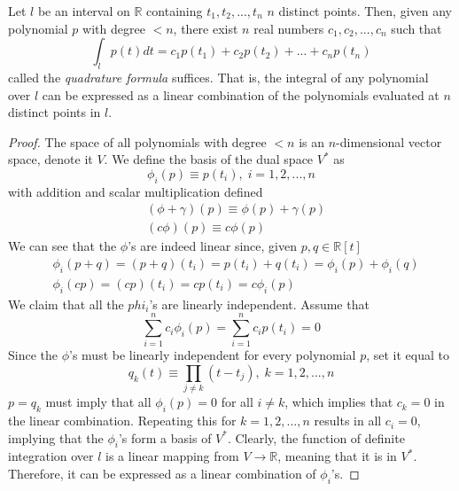   \begin{theorem}
    Let $l$ be an interval on $\mathbb{R}$ containing $t_1, t_2, ..., t_n$ $n$ distinct points. Then, given any polynomial $p$ with degree $< n$, there exist $n$ real numbers $c_1, c_2, ..., c_n$ such that
    \begin{equation}
      \int_l p(t) d t = c_1 p(t_1) + c_2 p(t_2) + ... + c_n p(t_n)
    \end{equation}
    called the \textit{quadrature formula} suffices. That is, the integral of any polynomial over $l$ can be expressed as a linear combination of the polynomials evaluated at $n$ distinct points in $l$. 
  \end{theorem}
  \begin{proof}
    The space of all polynomials with degree $< n$ is an $n$-dimensional vector space, denote it $V$. We define the basis of the dual space $V^*$ as 
    \begin{equation}
      \phi_i (p) \equiv p(t_i), \; i = 1, 2, ..., n
    \end{equation}
    with addition and scalar multiplication defined
    \begin{align*}
      & (\phi + \gamma) (p) \equiv \phi(p) + \gamma(p) \\
      & (c \phi) (p) \equiv c \phi (p) 
    \end{align*}
    We can see that the $\phi$'s are indeed linear since, given $p, q \in \mathbb{R}[t]$
    \begin{align*}
      & \phi_i (p + q) = (p + q) (t_i) = p(t_i) + q(t_i) = \phi_i (p) + \phi_i (q) \\
      & \phi_i (c p) = (c p) (t_i) = c p(t_i) = c \phi_i (p)
    \end{align*}
    We claim that all the $phi_i$'s are linearly independent. Assume that 
    \begin{equation}
      \sum_{i=1}^n c_i \phi_i (p) = \sum_{i=1}^n c_i p(t_i) = 0
    \end{equation}
    Since the $\phi$'s must be linearly independent for every polynomial $p$, set it equal to
    \begin{equation}
      q_k (t) \equiv \prod_{j \neq k} (t - t_j), \; k = 1, 2, ..., n
    \end{equation}
    $p = q_k$ must imply that all $\phi_i (p) = 0$ for all $i \neq k$, which implies that $c_k = 0$ in the linear combination. Repeating this for $k = 1, 2, ..., n$ results in all $c_i = 0$, implying that the $\phi_i$'s form a basis of $V^*$. Clearly, the function of definite integration over $l$ is a linear mapping from $V \longrightarrow \mathbb{R}$, meaning that it is in $V^*$. Therefore, it can be expressed as a linear combination of $\phi_i$'s. 
  \end{proof}

